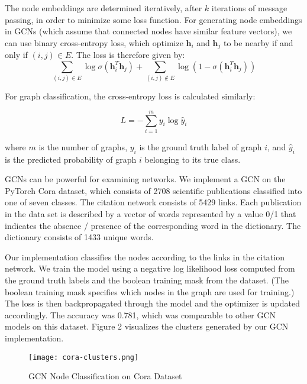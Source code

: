 \documentclass[final]{article}
\begin{document}
The node embeddings are determined iteratively, after $k$ iterations of message passing, in order to minimize some loss function. For generating node embeddings in GCNs (which assume that connected nodes have similar feature vectors), we can use binary cross-entropy loss, which optimize $\textbf{h}_i$ and $\textbf{h}_j$ to be nearby if and only if $(i, j) \in E$. The loss is therefore given by: 
$$\sum_{(i, j) \in E} \log \sigma(\textbf{h}_i^T\textbf{h}_j) + \sum_{(i, j) \not\in E} \log (1 - \sigma(\textbf{h}_i^T\textbf{h}_j))$$

For graph classification, the cross-entropy loss is calculated similarly:

$$L=-\sum_{i=1}^{m} y_{i} \log \hat{y}_{i}$$

where $m$ is the number of graphs, $y_{i}$ is the ground truth label of graph $i$, and $\hat{y}_{i}$ is the predicted probability of graph $i$ belonging to its true class.

GCNs can be powerful for examining networks. We implement a GCN on the PyTorch Cora dataset, which consists of 2708 scientific publications classified into one of seven classes. The citation network consists of 5429 links. Each publication in the data set is described by a vector of words represented by a value 0/1 that indicates the absence / presence of the corresponding word in the dictionary. The dictionary consists of 1433 unique words. 

Our implementation classifies the nodes according to the links in the citation network. We train the model using a negative log likelihood loss computed from the ground truth labels and the boolean training mask from the dataset. (The boolean training mask specifies which nodes in the graph are used for training.) The loss is then backpropagated through the model and the optimizer is updated accordingly. The accuracy was 0.781, which was comparable to other GCN models on this dataset. Figure 2 visualizes the clusters generated by our GCN implementation. 

\begin{figure}[!hbt]
  \centering
 \texttt{[image: cora-clusters.png]}
  \caption{GCN Node Classification on Cora Dataset}
 \end{figure}
 
\end{document}
